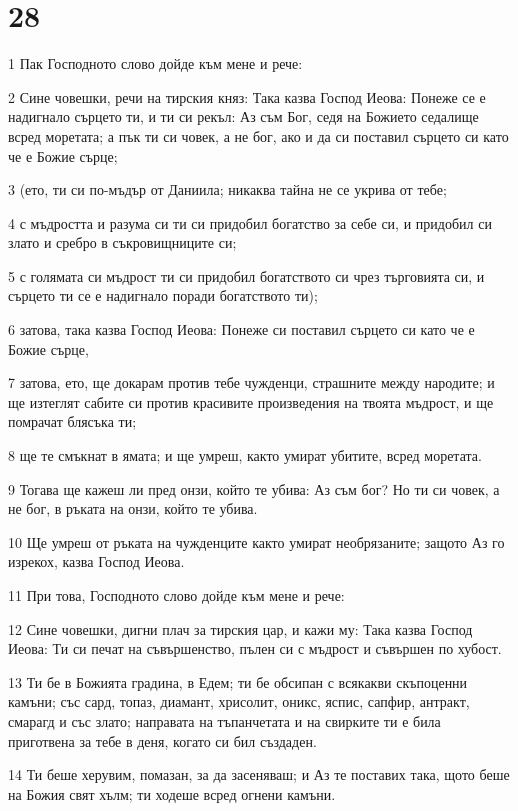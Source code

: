 \chapter{28}

\par 1 Пак Господното слово дойде към мене и рече:
\par 2 Сине човешки, речи на тирския княз: Така казва Господ Иеова: Понеже се е надигнало сърцето ти, и ти си рекъл: Аз съм Бог, седя на Божието седалище всред моретата; а пък ти си човек, а не бог, ако и да си поставил сърцето си като че е Божие сърце;
\par 3 (ето, ти си по-мъдър от Даниила; никаква тайна не се укрива от тебе;
\par 4 с мъдростта и разума си ти си придобил богатство за себе си, и придобил си злато и сребро в съкровищниците си;
\par 5 с голямата си мъдрост ти си придобил богатството си чрез търговията си, и сърцето ти се е надигнало поради богатството ти);
\par 6 затова, така казва Господ Иеова: Понеже си поставил сърцето си като че е Божие сърце,
\par 7 затова, ето, ще докарам против тебе чужденци, страшните между народите; и ще изтеглят сабите си против красивите произведения на твоята мъдрост, и ще помрачат блясъка ти;
\par 8 ще те смъкнат в ямата; и ще умреш, както умират убитите, всред моретата.
\par 9 Тогава ще кажеш ли пред онзи, който те убива: Аз съм бог? Но ти си човек, а не бог, в ръката на онзи, който те убива.
\par 10 Ще умреш от ръката на чужденците както умират необрязаните; защото Аз го изрекох, казва Господ Иеова.
\par 11 При това, Господното слово дойде към мене и рече:
\par 12 Сине човешки, дигни плач за тирския цар, и кажи му: Така казва Господ Иеова: Ти си печат на съвършенство, пълен си с мъдрост и съвършен по хубост.
\par 13 Ти бе в Божията градина, в Едем; ти бе обсипан с всякакви скъпоценни камъни; със сард, топаз, диамант, хрисолит, оникс, яспис, сапфир, антракт, смарагд и със злато; направата на тъпанчетата и на свирките ти е била приготвена за тебе в деня, когато си бил създаден.
\par 14 Ти беше херувим, помазан, за да засеняваш; и Аз те поставих така, щото беше на Божия свят хълм; ти ходеше всред огнени камъни.
